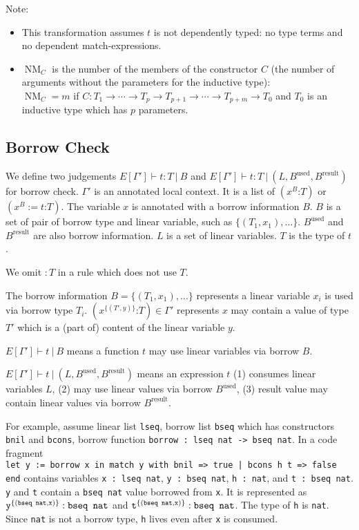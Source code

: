 \documentclass[a4paper,fleqn]{article}
\newcommand{\kwmatch}{\mbox{\color{mygreen}\ttfamily match}}
\newcommand{\lassum}[2]{(#1\mathord{:}#2)}
\newcommand{\ldef}[3]{(#1:=#2\mathord{:}#3)}
\DeclareMathOperator{\NM}{NM} %
\begin{document}
{\small Note:
\begin{itemize}
  \item This transformation assumes $t$ is not dependently typed: no type terms and no dependent \kwmatch-expressions.
  \item $\NM_C$ is the number of the members of the constructor $C$ (the number of arguments without the parameters for the inductive type): \\
    $\NM_C=m$ if $C : T_1 \rightarrow \dotsb \rightarrow T_p \rightarrow T_{p+1} \rightarrow \dotsb \rightarrow T_{p+m} \rightarrow T_0$ and $T_0$ is an inductive type which has $p$ parameters.
\end{itemize}}

\subsection{Borrow Check}\label{sec:borrow-check}

We define two judgements $E[\Gamma'] \vdash t:T~|~B$ and $E[\Gamma'] \vdash t:T~|~(L, B^\text{used}, B^\text{result})$ for borrow check.
$\Gamma'$ is an annotated local context.
It is a list of $\lassum{x^B}{T}$ or $\ldef{x^B}{t}{T}$.
The variable $x$ is annotated with a borrow information $B$.
$B$ is a set of pair of borrow type and linear variable, such as $\{(T_1,x_1),\ldots\}$.
$B^\text{used}$ and $B^\text{result}$ are also borrow information.
$L$ is a set of linear variables.
$T$ is the type of $t$.

We omit $:T$ in a rule which does not use $T$.

The borrow information $B=\{(T_1,x_1),\ldots\}$ represents a linear variable $x_i$ is used via borrow type $T_i$.
$\lassum{x^{\{(T',y)\}}}{T}\in \Gamma'$ represents $x$ may contain a value of type $T'$ which is a (part of) content of the linear variable $y$.

$E[\Gamma'] \vdash t~|~B$ means a function $t$ may use linear variables via borrow $B$.

$E[\Gamma'] \vdash t~|~(L, B^\text{used}, B^\text{result})$ means an expression $t$
(1) consumes linear variables $L$,
(2) may use linear values via borrow $B^\text{used}$,
(3) result value may contain linear values via borrow $B^\text{result}$.

For example, assume linear list \lstinline!lseq!, borrow list \lstinline!bseq! which has constructors \lstinline!bnil! and \lstinline!bcons!,
borrow function \lstinline!borrow : lseq nat -> bseq nat!.
In a code fragment \\
\lstinline!let y := borrow x in match y with bnil => true | bcons h t => false end! contains variables
\lstinline!x : lseq nat!,
\lstinline!y : bseq nat!,
\lstinline!h : nat!, and
\lstinline!t : bseq nat!.
\texttt{y} and \texttt{t} contain a \texttt{bseq nat} value borrowed from \texttt{x}.
It is represented as
$\texttt{y}^{\{(\texttt{bseq nat},\texttt{x})\}}:\text{\texttt{bseq nat}}$ and
$\texttt{t}^{\{(\texttt{bseq nat},\texttt{x})\}}:\text{\texttt{bseq nat}}$.
The type of \texttt{h} is \texttt{nat}.
Since \texttt{nat} is not a borrow type, \texttt{h} lives even after \texttt{x} is consumed.
\end{document}
